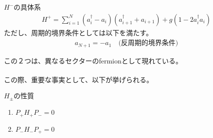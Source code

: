 \documentclass[a4paper,10.5pt]{article}
\numberwithin{equation}{section}
\begin{document}
\begin{resultbox}{$H^{-}$の具体系}
    \begin{align*}
        H^{+}=\sum_{i=1}^{N}(a_{i}^{\dagger}-a_{i})(a_{i+1}^{\dagger}+a_{i+1})+g(1-2a^{\dagger}_{i}a_{i})
    \end{align*}
    ただし、周期的境界条件としては以下を満たす。
    \begin{align*}
        a_{N+1}=-a_{1}\quad \text{(反周期的境界条件)}
    \end{align*}
\end{resultbox}
この２つは、異なるセクターのfermionとして現れている。\\
\\
この際、重要な事実として、以下が挙げられる。
\begin{resultbox}{$H_{\pm}$の性質}
    \begin{enumerate}
        \item $P_{+}H_{+}P_{-}=0$
        \item $P_{-}H_{-}P_{+}=0$
    \end{enumerate}
\end{resultbox}
\end{document}
